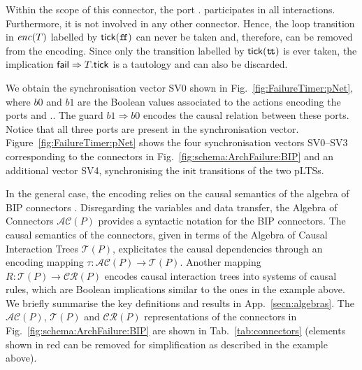 \documentclass{llncs}
\newcommand{\fig}[1]{Fig.~\ref{fig:#1}}
\newcommand{\Fig}[1]{Figure~\ref{fig:#1}}
\newcommand{\tab}[1]{Tab.~\ref{tab:#1}}
\newcommand{\app}[1]{App.~\ref{secn:#1}}
\newcommand{\ndash}{--}
\newcommand{\true} {\ensuremath{\mathtt{t\!t}}}
\newcommand{\false}{\ensuremath{\mathtt{f\!f}}}
\newcommand{\init} {\ensuremath{\mathsf{init}}}
\newcommand{\ct}{\ensuremath{\mathcal{T}}}
\newcommand{\cru}{\ensuremath{\mathcal{CR}}}
\newcommand{\ac}{\ensuremath{\mathcal{AC}}}
\newcommand{\nopri}[1][]{\ensuremath{\mathit{enc}%
    \ifx#1\relax\else(#1)\fi}}
\begin{document}
Within the scope of this connector, the port {\NameTimer.\PortTick}
participates in all interactions.
%
Furthermore, it is not involved in any other
connector.  Hence, the loop transition in \nopri[\NameTimer]
labelled by $\PortTick(\false)$ can never be taken and, therefore, can
be removed from the encoding.  Since only the transition
labelled by $\PortTick(\true)$ is ever taken, 
%
the
implication $\mathsf{fail} \Rightarrow T.\mathsf{tick}$ is a tautology and can also be discarded.

We obtain the
synchronisation vector SV0 shown in \fig{FailureTimer:pNet}, where $b0$ and
$b1$ are the Boolean values associated to the actions encoding the
ports {\PortFail} and {\NameCtrl.\PortFail}.
The guard $b1 \Rightarrow b0$ encodes the causal
relation between these ports.  Notice
that %
all three ports are present in the
synchronisation vector.  \Fig{FailureTimer:pNet} shows
the four synchronisation vectors SV0\ndash SV3 corresponding to the
connectors in \fig{schema:ArchFailure:BIP} and an additional vector
SV4, synchronising the {\init} transitions of the two pLTSs.

In the general case, the encoding relies on the causal semantics of the
algebra of BIP connectors \cite{BliSif10-causal-fmsd}.  Disregarding
the variables and data transfer, the Algebra of Connectors $\ac(P)$
\cite{BliSif07-acp-emsoft} provides a syntactic notation for the BIP
connectors.  The causal semantics of the connectors, given in terms of
the Algebra of Causal Interaction Trees $\ct(P)$, explicitates the
causal dependencies through an encoding mapping
$\tau: \ac(P) \rightarrow \ct(P)$.  Another mapping $R: \ct(P)
\rightarrow \cru(P)$ encodes causal interaction trees into systems of
causal rules, which are Boolean implications similar to the ones in
the example above.  We briefly summarise the key definitions and
results in \app{algebras}.  The $\ac(P)$, $\ct(P)$ and $\cru(P)$
representations of the connectors in \fig{schema:ArchFailure:BIP} are
shown in \tab{connectors} (elements shown in red can be removed for
simplification as described in the example above).
\end{document}
